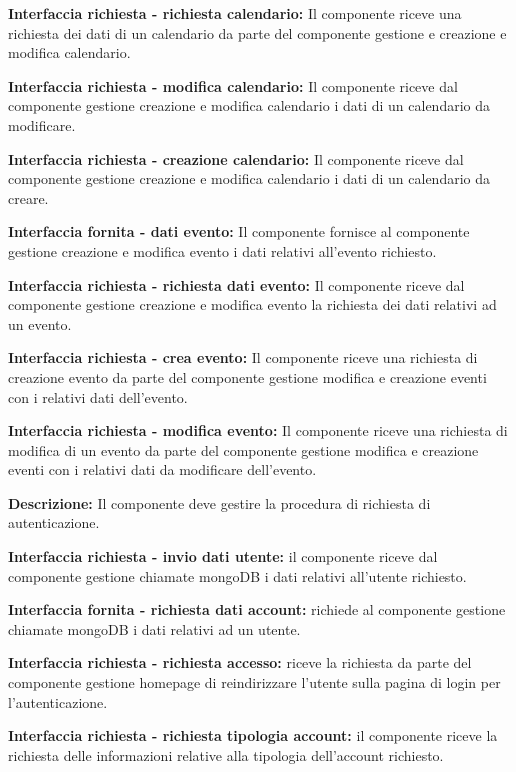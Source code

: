 \begin{listaPersonale}[DCI]{}
    \textbf{Interfaccia richiesta - richiesta calendario:} Il componente riceve una richiesta dei dati di un calendario da parte del componente gestione e creazione e modifica calendario.

    \textbf{Interfaccia richiesta - modifica calendario:} Il componente riceve dal componente gestione creazione e modifica calendario i dati di un calendario da modificare.

    \textbf{Interfaccia richiesta  - creazione calendario:} Il componente riceve dal componente gestione creazione e modifica calendario i dati di un calendario da creare.

    \textbf{Interfaccia fornita - dati evento:} Il componente fornisce al componente gestione creazione e modifica evento i dati relativi all'evento richiesto.

    \textbf{Interfaccia richiesta - richiesta dati evento:} Il componente riceve dal componente gestione creazione e modifica evento la richiesta dei dati relativi ad un evento.

    \textbf{Interfaccia richiesta - crea evento:} Il componente riceve una richiesta di creazione evento da parte del componente gestione modifica e creazione eventi con i relativi dati dell'evento.

    \textbf{Interfaccia richiesta - modifica evento:} Il componente riceve una richiesta di modifica di un evento da parte del componente gestione modifica e creazione eventi con i relativi dati da modificare dell'evento.



    \textbf{Descrizione:}  Il componente deve gestire la procedura di richiesta di autenticazione.

    \textbf{Interfaccia richiesta - invio dati utente:} il componente riceve dal componente gestione chiamate mongoDB i dati relativi all'utente richiesto.

    \textbf{Interfaccia fornita - richiesta dati account:} richiede al componente gestione chiamate mongoDB i dati relativi ad un utente.

    \textbf{Interfaccia richiesta - richiesta accesso:} riceve la richiesta da parte del componente gestione homepage di reindirizzare l'utente sulla pagina di login per l'autenticazione.

    \textbf{Interfaccia richiesta - richiesta tipologia account:} il componente riceve la richiesta delle informazioni relative alla tipologia dell'account richiesto.


\end{listaPersonale}
